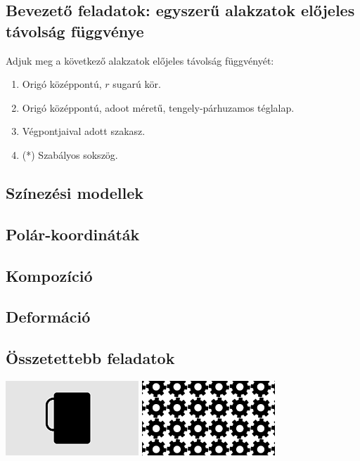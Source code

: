 \subsection{Bevezető feladatok: egyszerű alakzatok előjeles távolság függvénye}

Adjuk meg a következő alakzatok előjeles távolság függvényét:

\begin{enumerate}
  \item Origó középpontú, $r$ sugarú kör.
  \item Origó középpontú, adoot méretű, tengely-párhuzamos téglalap.
  \item Végpontjaival adott szakasz.
  \item (*) Szabályos sokszög.
\end{enumerate}

\subsection{Színezési modellek}

\subsection{Polár-koordináták}

\subsection{Kompozíció}

\subsection{Deformáció}

\subsection{Összetettebb feladatok}

\includegraphics[width=5cm]{images/mug.png}
\includegraphics[width=5cm]{images/cogwheels.png}

